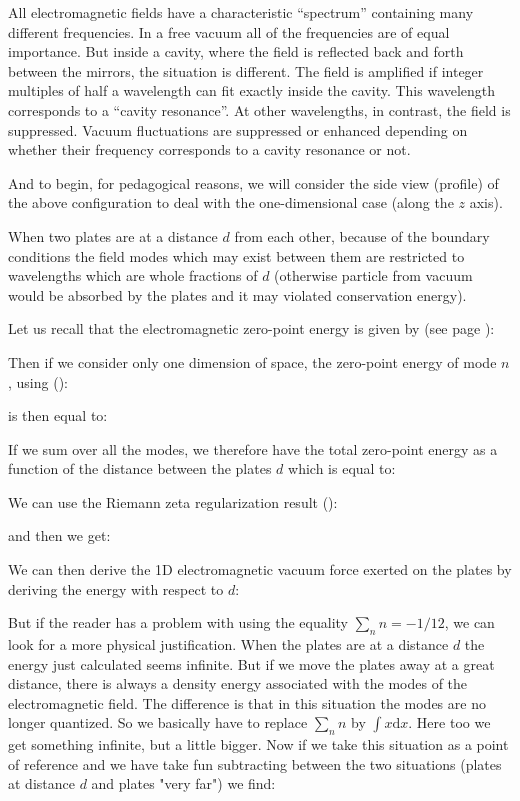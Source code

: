 		All electromagnetic fields have a characteristic “spectrum” containing many different frequencies. In a free vacuum all of the frequencies are of equal importance. But inside a cavity, where the field is reflected back and forth between the mirrors, the situation is different. The field is amplified if integer multiples of half a wavelength can fit exactly inside the cavity. This wavelength corresponds to a “cavity resonance”. At other wavelengths, in contrast, the field is suppressed. Vacuum fluctuations are suppressed or enhanced depending on whether their frequency corresponds to a cavity resonance or not.
	
	And to begin, for pedagogical reasons, we will consider the side view (profile) of the above configuration to deal with the one-dimensional case (along the $z$ axis).
	
	When two plates are at a distance $d$ from each other, because of the boundary conditions the field modes which may exist between them are restricted to wavelengths which are whole fractions of $d$ (otherwise particle from vacuum would be absorbed by the plates and it may violated conservation energy).
	
	Let us recall that the electromagnetic zero-point energy is given by (see page \pageref{planck zero point energy}):
		
	Then if we consider only one dimension of space, the zero-point energy of mode $n$, using ():
	
	is then equal to:
	
	If we sum over all the modes, we therefore have the total zero-point energy as a function of the distance between the plates $d$ which is equal to:
	
	We can use the Riemann zeta regularization result ():
	
	and then we get:
	
	We can then derive the 1D electromagnetic vacuum force exerted on the plates by deriving the energy with respect to $d$:
	
	But if the reader has a problem with using the equality $\sum_n n = -1/12$, we can look for a more physical justification. When the plates are at a distance $d$ the energy just calculated seems infinite. But if we move the plates away at a great distance, there is always a density energy associated with the modes of the electromagnetic field. The difference is that in this situation the modes are no longer quantized. So we basically have to replace $\sum_n n$ by $\int x \mathrm{d}x$. Here too we get something infinite, but a little bigger. Now if we take this situation as a point of reference and we have take fun subtracting between the two situations (plates at distance $d$ and plates "very far") we find:
	
